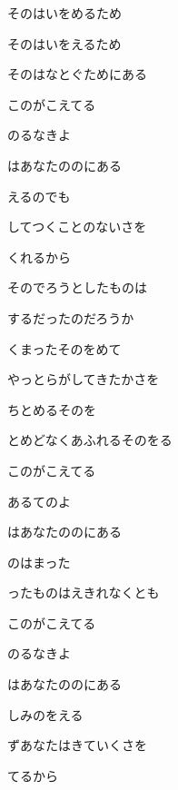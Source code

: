 \documentclass[14pt]{ltjsarticle}
\begin{document}
{\item
  そのはいをめるため
  \jisho{}

  そのはいをえるため
  \jisho{}

  そのはなとぐためにある
  \jisho{}

\item
  このがこえてる
  \jisho{}

  のるなきよ
  \jisho{}

  はあなたののにある
  \jisho{}

  えるのでも
  \jisho{}

  してつくことのないさを
  \jisho{}

  くれるから
  \jisho{}

\item
  そのでろうとしたものは
  \jisho{}

  するだったのだろうか
  \jisho{}

  くまったそのをめて
  \jisho{}

  やっとらがしてきたかさを
  \jisho{}

  ちとめるそのを
  \jisho{}

  とめどなくあふれるそのをる
  \jisho{}

\item
  このがこえてる
  \jisho{}

  あるてのよ
  \jisho{}

  はあなたののにある
  \jisho{}

  のはまった
  \jisho{}

  ったものはえきれなくとも
  \jisho{}

\item
  このがこえてる
  \jisho{}

  のるなきよ
  \jisho{}

  はあなたののにある
  \jisho{}

  しみのをえる
  \jisho{}

  ずあなたはきていくさを
  \jisho{}

  てるから
  \jisho{}

  
}
\end{document}
